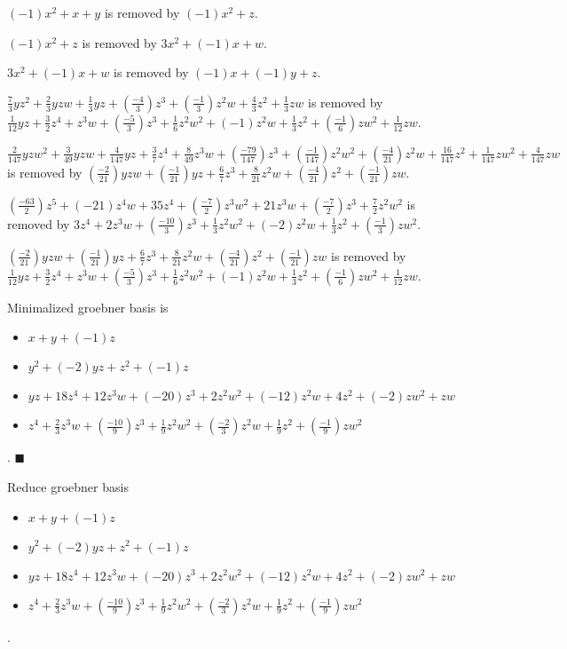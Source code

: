 \documentclass{jsarticle}
\begin{document}
$(-1)x^{2}+x+y$ is removed by $(-1)x^{2}+z$.  

$(-1)x^{2}+z$ is removed by $3x^{2}+(-1)x+w$.  

$3x^{2}+(-1)x+w$ is removed by $(-1)x+(-1)y+z$.  

$\frac{7}{3}yz^{2}+\frac{2}{3}yzw+\frac{1}{3}yz+(\frac{-4}{3})z^{3}+(\frac{-1}{3})z^{2}w+\frac{4}{3}z^{2}+\frac{1}{3}zw$ is removed by $\frac{1}{12}yz+\frac{3}{2}z^{4}+z^{3}w+(\frac{-5}{3})z^{3}+\frac{1}{6}z^{2}w^{2}+(-1)z^{2}w+\frac{1}{3}z^{2}+(\frac{-1}{6})zw^{2}+\frac{1}{12}zw$.  

$\frac{2}{147}yzw^{2}+\frac{3}{49}yzw+\frac{4}{147}yz+\frac{3}{7}z^{4}+\frac{8}{49}z^{3}w+(\frac{-79}{147})z^{3}+(\frac{-1}{147})z^{2}w^{2}+(\frac{-4}{21})z^{2}w+\frac{16}{147}z^{2}+\frac{1}{147}zw^{2}+\frac{4}{147}zw$ is removed by $(\frac{-2}{21})yzw+(\frac{-1}{21})yz+\frac{6}{7}z^{3}+\frac{8}{21}z^{2}w+(\frac{-4}{21})z^{2}+(\frac{-1}{21})zw$.  

$(\frac{-63}{2})z^{5}+(-21)z^{4}w+35z^{4}+(\frac{-7}{2})z^{3}w^{2}+21z^{3}w+(\frac{-7}{2})z^{3}+\frac{7}{2}z^{2}w^{2}$ is removed by $3z^{4}+2z^{3}w+(\frac{-10}{3})z^{3}+\frac{1}{3}z^{2}w^{2}+(-2)z^{2}w+\frac{1}{3}z^{2}+(\frac{-1}{3})zw^{2}$.  

$(\frac{-2}{21})yzw+(\frac{-1}{21})yz+\frac{6}{7}z^{3}+\frac{8}{21}z^{2}w+(\frac{-4}{21})z^{2}+(\frac{-1}{21})zw$ is removed by $\frac{1}{12}yz+\frac{3}{2}z^{4}+z^{3}w+(\frac{-5}{3})z^{3}+\frac{1}{6}z^{2}w^{2}+(-1)z^{2}w+\frac{1}{3}z^{2}+(\frac{-1}{6})zw^{2}+\frac{1}{12}zw$.  

Minimalized groebner basis is 
\begin{itemize}
\item $x+y+(-1)z$
\item $y^{2}+(-2)yz+z^{2}+(-1)z$
\item $yz+18z^{4}+12z^{3}w+(-20)z^{3}+2z^{2}w^{2}+(-12)z^{2}w+4z^{2}+(-2)zw^{2}+zw$
\item $z^{4}+\frac{2}{3}z^{3}w+(\frac{-10}{9})z^{3}+\frac{1}{9}z^{2}w^{2}+(\frac{-2}{3})z^{2}w+\frac{1}{9}z^{2}+(\frac{-1}{9})zw^{2}$
\end{itemize}  . 
$\blacksquare{}$

Reduce groebner basis 
\begin{itemize}
\item $x+y+(-1)z$
\item $y^{2}+(-2)yz+z^{2}+(-1)z$
\item $yz+18z^{4}+12z^{3}w+(-20)z^{3}+2z^{2}w^{2}+(-12)z^{2}w+4z^{2}+(-2)zw^{2}+zw$
\item $z^{4}+\frac{2}{3}z^{3}w+(\frac{-10}{9})z^{3}+\frac{1}{9}z^{2}w^{2}+(\frac{-2}{3})z^{2}w+\frac{1}{9}z^{2}+(\frac{-1}{9})zw^{2}$
\end{itemize}  . 
\end{document}
